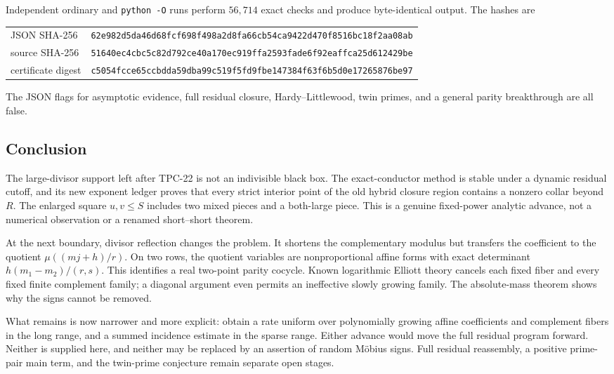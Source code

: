Independent ordinary and \texttt{python -O} runs perform \(56{,}714\)
exact checks and produce byte-identical output.  The hashes are
\begin{center}
\scriptsize
\begin{tabular}{@{}ll@{}}
\toprule
JSON SHA-256
&\nolinkurl{62e982d5da46d68fcf698f498a2d8fa66cb54ca9422d470f8516bc18f2aa08ab}\\
source SHA-256
&\nolinkurl{51640ec4cbc5c82d792ce40a170ec919ffa2593fade6f92eaffca25d612429be}\\
certificate digest
&\nolinkurl{c5054fcce65ccbdda59dba99c519f5fd9fbe147384f63f6b5d0e17265876be97}\\
\bottomrule
\end{tabular}
\end{center}
The JSON flags for asymptotic evidence, full residual closure,
Hardy--Littlewood, twin primes, and a general parity breakthrough are
all false.

\subsection{Conclusion}

The large-divisor support left after TPC-22 is not an indivisible black
box.  The exact-conductor method is stable under a dynamic residual
cutoff, and its new exponent ledger proves that every strict interior
point of the old hybrid closure region contains a nonzero collar beyond
\(R\).  The enlarged square \(u,v\le S\) includes two mixed pieces and
a both-large piece.  This is a genuine fixed-power analytic advance,
not a numerical observation or a renamed short--short theorem.

At the next boundary, divisor reflection changes the problem.  It
shortens the complementary modulus but transfers the coefficient to
the quotient \(\mu((mj+h)/r)\).  On two rows, the quotient variables
are nonproportional affine forms with exact determinant
\(h(m_1-m_2)/(r,s)\).  This identifies a real two-point parity
cocycle.  Known logarithmic Elliott theory cancels each fixed fiber and
every fixed finite complement family; a diagonal argument even permits
an ineffective slowly growing family.  The absolute-mass theorem shows
why the signs cannot be removed.

What remains is now narrower and more explicit: obtain a rate uniform
over polynomially growing affine coefficients and complement fibers in
the long range, and a summed incidence estimate in the sparse range.
Either advance would move the full residual program forward.  Neither
is supplied here, and neither may be replaced by an assertion of random
M\"obius signs.  Full residual reassembly, a positive prime-pair main
term, and the twin-prime conjecture remain separate open stages.
